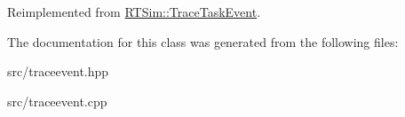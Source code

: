 Reimplemented from \hyperlink{classRTSim_1_1TraceTaskEvent_ac4b6e232c88506a951709d01e6fb5106}{R\+T\+Sim\+::\+Trace\+Task\+Event}.



The documentation for this class was generated from the following files\+:\begin{DoxyCompactItemize}
\item 
src/traceevent.\+hpp\item 
src/traceevent.\+cpp\end{DoxyCompactItemize}
